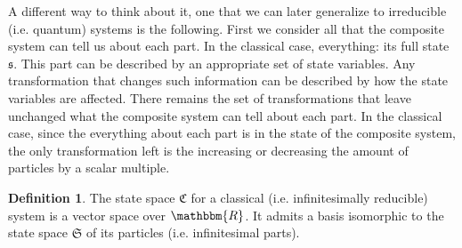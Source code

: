 \documentclass[aps,pra,10pt,twocolumn,floatfix,nofootinbib]{revtex4-1}
\theoremstyle{definition}
\newtheorem{defn}[prop]{Definition}
\begin{document}
A different way to think about it, one that we can later generalize to irreducible (i.e. quantum) systems is the following. First we consider all that the composite system can tell us about each part. In the classical case, everything: its full state $\mathfrak{s}$. This part can be described by an appropriate set of state variables. Any transformation that changes such information can be described by how the state variables are affected. There remains the set of transformations that leave unchanged what the composite system can tell about each part. In the classical case, since the everything about each part is in the state of the composite system, the only transformation left is the increasing or decreasing the amount of particles by a scalar multiple.

\begin{defn}\label{vector space}
The state space $\mathfrak{C}$ for a classical (i.e. infinitesimally reducible) system is a vector space over $\mathbbm{R}$. It admits a basis isomorphic to the state space $\mathfrak{S}$ of its particles (i.e. infinitesimal parts).
\end{defn}
\end{document}
